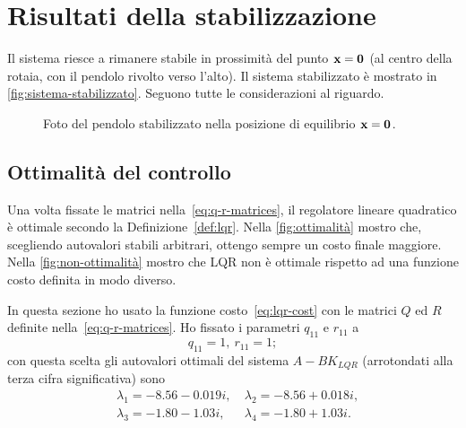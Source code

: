 \section{Risultati della stabilizzazione}
Il sistema riesce a rimanere stabile in prossimità del punto $\mathbf{x} = \mathbf{0}$
(al centro della rotaia, con il pendolo rivolto verso l'alto).
Il sistema stabilizzato è mostrato in \autoref{fig:sistema-stabilizzato}.
Seguono tutte le considerazioni al riguardo.


\begin{figure}[H]
    \centering
    \caption[Pendolo stabilizzato]{Foto del pendolo stabilizzato nella
    posizione di equilibrio $\mathbf{x} = \mathbf{0}$.}
    \label{fig:sistema-stabilizzato}
\end{figure}


\subsection{Ottimalità del controllo}
Una volta fissate le matrici nella~\eqref{eq:q-r-matrices},
il regolatore lineare quadratico è ottimale secondo la
Definizione~\ref{def:lqr}.
Nella \autoref{fig:ottimalità} mostro che, scegliendo autovalori
stabili arbitrari, ottengo sempre un costo finale maggiore.
Nella \autoref{fig:non-ottimalità} mostro che LQR non è
ottimale rispetto ad una funzione costo definita in modo diverso.

In questa sezione ho usato la funzione costo~\eqref{eq:lqr-cost} con le matrici
$Q$ ed $R$ definite nella~\eqref{eq:q-r-matrices}. 
Ho fissato i parametri $q_{11}$ e $r_{11}$ a
\begin{equation*}
    q_{11} = 1,\  r_{11} = 1;
\end{equation*}
con questa scelta gli autovalori ottimali del sistema $A - BK_{LQR}$ (arrotondati alla terza cifra significativa) sono
\begin{equation}
    \left.
        \begin{aligned}
        &\lambda_1 = -8.56 - 0.019i, \
        &\lambda_2 = -8.56 + 0.018i, \\
        &\lambda_3 = -1.80 - 1.03i, \
        &\lambda_4 = -1.80 + 1.03i.
        \end{aligned}
    \right.
    \label{eq:lqr-eigenvalues}
\end{equation}

